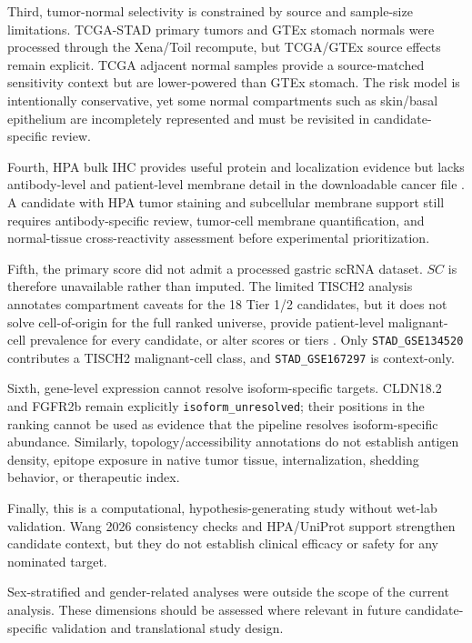 \documentclass[preprint,12pt,authoryear]{elsarticle}
\begin{document}
Third, tumor-normal selectivity is constrained by source and sample-size limitations. TCGA-STAD primary tumors and GTEx stomach normals were processed through the Xena/\allowbreak{}Toil recompute, but TCGA/\allowbreak{}GTEx source effects remain explicit. TCGA adjacent normal samples provide a source-matched sensitivity context but are lower-powered than GTEx stomach. The risk model is intentionally conservative, yet some normal compartments such as skin/\allowbreak{}basal epithelium are incompletely represented and must be revisited in candidate-specific review.

Fourth, HPA bulk IHC provides useful protein and localization evidence but lacks antibody-level and patient-level membrane detail in the downloadable cancer file \citep{uhlen2015hpa,uhlen2017pathology,thul2017subcellular}. A candidate with HPA tumor staining and subcellular membrane support still requires antibody-specific review, tumor-cell membrane quantification, and normal-tissue cross-reactivity assessment before experimental prioritization.

Fifth, the primary score did not admit a processed gastric scRNA dataset. $SC$ is therefore unavailable rather than imputed. The limited TISCH2 analysis annotates compartment caveats for the 18 Tier 1/\allowbreak{}2 candidates, but it does not solve cell-of-origin for the full ranked universe, provide patient-level malignant-cell prevalence for every candidate, or alter scores or tiers \citep{han2023tisch2,zhang2019gastric_scrna,jeong2021gastric_tme}. Only \texttt{STAD\_\allowbreak{}GSE134520} contributes a TISCH2 malignant-cell class, and \texttt{STAD\_\allowbreak{}GSE167297} is context-only.

Sixth, gene-level expression cannot resolve isoform-specific targets. CLDN18.2 and FGFR2b remain explicitly \texttt{isoform\_\allowbreak{}unresolved};\allowbreak{} their positions in the ranking cannot be used as evidence that the pipeline resolves isoform-specific abundance. Similarly, topology/\allowbreak{}accessibility annotations do not establish antigen density, epitope exposure in native tumor tissue, internalization, shedding behavior, or therapeutic index.

Finally, this is a computational, hypothesis-generating study without wet-lab validation. Wang 2026 consistency checks and HPA/\allowbreak{}UniProt support strengthen candidate context, but they do not establish clinical efficacy or safety for any nominated target.

Sex-stratified and gender-related analyses were outside the scope of the current analysis. These dimensions should be assessed where relevant in future candidate-specific validation and translational study design.
\end{document}
